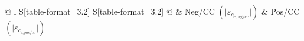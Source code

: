 \begin{table}[!htbp]
\begin{tabular}{@{} l S[table-format=3.2] S[table-format=3.2] @{}}
         & {Neg/CC $\left(\big\lvert \varepsilon_{c_\text{e,neg/cc}} \big \rvert\right)$} & {Pos/CC $\left(\big\lvert
        \varepsilon_{c_\text{e,pos/cc}} \big \rvert\right)$} \\
        \bottomrule
    \end{tabular}
\end{table}
